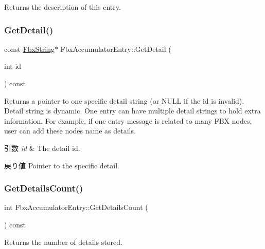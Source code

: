 Returns the description of this entry. 

\mbox{\label{class_fbx_accumulator_entry_a1698d2ce0b959f30b912716a893cf274}} 
\subsubsection{\texorpdfstring{Get\+Detail()}{GetDetail()}}
{\footnotesize\ttfamily const \hyperlink{class_fbx_string}{Fbx\+String}$\ast$ Fbx\+Accumulator\+Entry\+::\+Get\+Detail (\begin{DoxyParamCaption}\item[{int}]{id }\end{DoxyParamCaption}) const}

Returns a pointer to one specific detail string (or N\+U\+LL if the id is invalid). Detail string is dynamic. One entry can have multiple detail strings to hold extra information. For example, if one entry message is related to many F\+BX nodes, user can add these nodes\textquotesingle{} name as details. 
\begin{DoxyParams}{引数}
{\em id} & The detail id. \\
\hline
\end{DoxyParams}
\begin{DoxyReturn}{戻り値}
Pointer to the specific detail. 
\end{DoxyReturn}
\mbox{\label{class_fbx_accumulator_entry_adc709cecc41aa46b5874877c49f99b19}} 
\subsubsection{\texorpdfstring{Get\+Details\+Count()}{GetDetailsCount()}}
{\footnotesize\ttfamily int Fbx\+Accumulator\+Entry\+::\+Get\+Details\+Count (\begin{DoxyParamCaption}{ }\end{DoxyParamCaption}) const}



Returns the number of details stored. 


